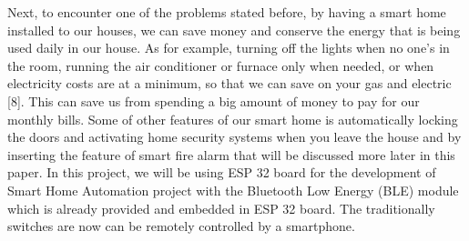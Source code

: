 Next, to encounter one of the problems stated before, by having a smart home installed to our houses, we can save money and conserve the energy that is being used daily in our house. As for example, turning off the lights when no one’s in the room, running the air conditioner or furnace only when needed, or when electricity costs are at a minimum, so that we can save on your gas and electric [8]. This can save us from spending a big amount of money to pay for our monthly bills. Some of other features of our smart home is automatically locking the doors and activating home security systems when you leave the house and by inserting the feature of smart fire alarm that will be discussed more later in this paper. In this project, we will be using ESP 32 board for the development of Smart Home Automation project with the Bluetooth Low Energy (BLE) module which is already provided and embedded in ESP 32 board. The traditionally switches are now can be remotely controlled by a smartphone.
